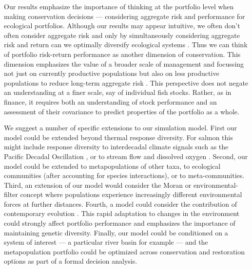 Our results emphasize the importance of thinking at the portfolio level when making conservation decisions --- considering aggregate risk and performance for ecological portfolios. Although our results may appear intuitive, we often don't often consider aggregate risk and only by simultaneously considering aggregate risk and return can we optimally diversify ecological systems \citep{ando2012}. Thus we can think of portfolio risk-return performance as another dimension of conservation. This dimension emphasizes the value of a broader scale of management and focussing not just on currently productive populations but also on less productive populations to reduce long-term aggregate risk \citep[e.g.][]{hilborn2003, price2008}. This perspective does not negate an understanding at a finer scale, say of individual fish stocks. Rather, as in finance, it requires both an understanding of stock performance and an assessment of their covariance to predict properties of the portfolio as a whole.

We suggest a number of specific extensions to our simulation model. First our model could be extended beyond thermal response diversity. For salmon this might include response diversity to interdecadal climate signals such as the Pacific Decadal Oscillation \citep{mantua2002}, or to stream flow and dissolved oxygen \citep{priede1988}. Second, our model could be extended to metapopulations of other taxa, to ecological communities (after accounting for species interactions), or to meta-communities. Third, an extension of our model would consider the Moran or environmental-filter concept \citep{schindler2008, rogers2008} where populations experience increasingly different environmental forces at further distances. Fourth, a model could consider the contribution of contemporary evolution \citep{stockwell2003}. This rapid adaptation to changes in the environment could strongly affect portfolio performance and emphasizes the importance of maintaining genetic diversity. Finally, our model could be conditioned on a system of interest --- a particular river basin for example --- and the metapopulation portfolio could be optimized across conservation and restoration options as part of a formal decision analysis.

